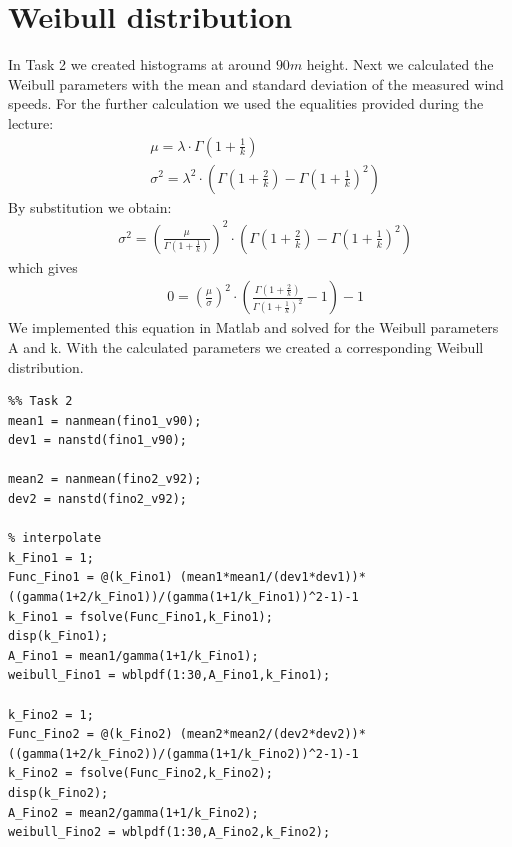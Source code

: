 \documentclass[10pt]{article}
\begin{document}
\newpage
\section{Weibull distribution}
In Task 2 we created histograms at around $90m$ height. Next we calculated the Weibull parameters with the mean and standard deviation of the measured wind speeds. For the further calculation we used the equalities provided during the lecture:
\begin{align*}
&\mu = \lambda \cdot \Gamma\left(1+\frac{1}{k}\right) \\
&\sigma^2 = \lambda^2 \cdot \left(\Gamma\left(1+\frac{2}{k}\right)-\Gamma\left(1+\frac{1}{k}\right)^2\right)
\end{align*}
By substitution we obtain:
\begin{align*}
&\sigma^2 = \left(\frac{\mu}{\Gamma(1+\frac{1}{k})}\right)^2 \cdot \left(\Gamma\left({1+\frac{2}{k}}\right)-\Gamma\left(1+\frac{1}{k}\right)^2\right)
\end{align*}
which gives
\begin{align*}
&0 = \left(\frac{\mu}{\sigma}\right)^2 \cdot \left(\frac{\Gamma\left({1+\frac{2}{k}}\right)}{\Gamma\left(1+\frac{1}{k}\right)^2}-1\right)-1
\end{align*}
 We implemented this equation in Matlab and solved for the Weibull parameters A and k. With the calculated parameters we created a corresponding Weibull distribution.


\begin{lstlisting}
%% Task 2
mean1 = nanmean(fino1_v90);
dev1 = nanstd(fino1_v90);

mean2 = nanmean(fino2_v92);
dev2 = nanstd(fino2_v92);

% interpolate
k_Fino1 = 1;
Func_Fino1 = @(k_Fino1) (mean1*mean1/(dev1*dev1))*((gamma(1+2/k_Fino1))/(gamma(1+1/k_Fino1))^2-1)-1 
k_Fino1 = fsolve(Func_Fino1,k_Fino1);
disp(k_Fino1);
A_Fino1 = mean1/gamma(1+1/k_Fino1);
weibull_Fino1 = wblpdf(1:30,A_Fino1,k_Fino1);

k_Fino2 = 1;
Func_Fino2 = @(k_Fino2) (mean2*mean2/(dev2*dev2))*((gamma(1+2/k_Fino2))/(gamma(1+1/k_Fino2))^2-1)-1 
k_Fino2 = fsolve(Func_Fino2,k_Fino2);
disp(k_Fino2);
A_Fino2 = mean2/gamma(1+1/k_Fino2);
weibull_Fino2 = wblpdf(1:30,A_Fino2,k_Fino2);
\end{lstlisting}
\end{document}
